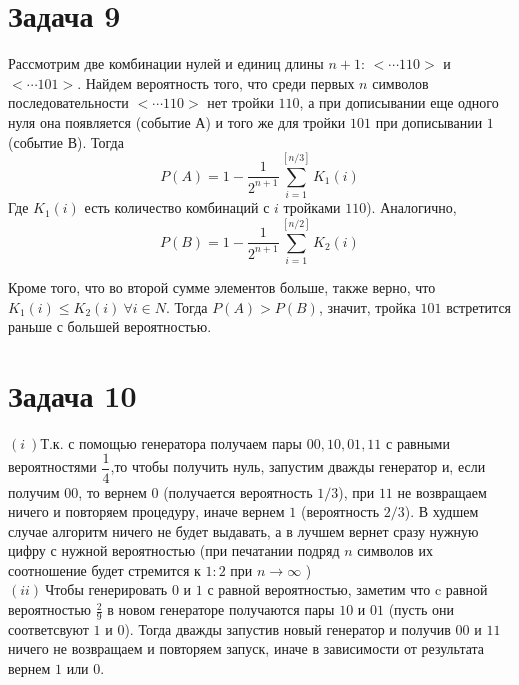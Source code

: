 \documentclass[a4paper,12pt]{article} %
\begin{document}
\section*{Задача 9}
Рассмотрим две комбинации нулей и единиц длины $n+1$: $<\cdots110>$ и $<\cdots101>$. Найдем вероятность того, что среди первых $n$ символов последовательности $<\cdots110>$ нет тройки $110$, а при дописывании еще одного нуля она появляется (событие А) и того же для тройки $101$ при дописывании $1$ (событие В). Тогда \[
P(A) = 1 - \frac{1}{2^{n+1}}\sum_{i=1}^{[n/3]}{K_1(i)}
\]
Где $K_1(i)$ есть количество комбинаций с $i$ тройками $110$).
Аналогично, 
\[
P(B) = 1 - \frac{1}{2^{n+1}}\sum_{i=1}^{[n/2]}{K_2(i)}
\]

Кроме того, что во второй сумме элементов больше, также верно, что $K_1(i) \leq K_2(i)~\forall i \in N$. Тогда $P(A) > P(B)$, значит, тройка $101$ встретится раньше с большей вероятностью.\\

\section*{Задача 10}  
$(i~)$Т.к. с помощью генератора получаем пары $00, 10, 01, 11$ с равными вероятностями $\dfrac{1}{4}$,то чтобы получить нуль, запустим дважды генератор и, если получим $00$, то вернем $0$ (получается вероятность $1/3$), при $11$ не возвращаем ничего и повторяем процедуру, иначе вернем $1$ (вероятность $2/3$). В худшем случае алгоритм ничего не будет выдавать, а в лучшем вернет сразу нужную цифру с  нужной вероятностью (при печатании подряд $n$ символов их соотношение будет стремится к $1:2$ при $n \rightarrow \infty$ ) \\
$(ii)~$Чтобы генерировать $0$ и $1$ с равной вероятностью, заметим что c  равной вероятностью $\frac{2}{9}$ в новом генераторе получаются пары $10$ и $01$ (пусть они соответсвуют $1 $ и $ 0$). Тогда дважды запустив новый генератор и получив $00$ и $11$ ничего не возвращаем и повторяем запуск, иначе в зависимости от результата вернем $1 $ или $ 0$.\\
\end{document}
